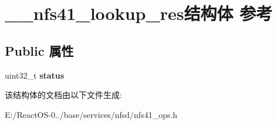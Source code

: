 \hypertarget{struct____nfs41__lookup__res}{}\section{\+\_\+\+\_\+nfs41\+\_\+lookup\+\_\+res结构体 参考}
\label{struct____nfs41__lookup__res}
\subsection*{Public 属性}
\begin{DoxyCompactItemize}
\item 
\mbox{\label{struct____nfs41__lookup__res_ab39e238056ab8b247434d118f7d626a4}} 
uint32\+\_\+t {\bfseries status}
\end{DoxyCompactItemize}


该结构体的文档由以下文件生成\+:\begin{DoxyCompactItemize}
\item 
E\+:/\+React\+O\+S-\/0../base/services/nfsd/nfs41\+\_\+ops.\+h\end{DoxyCompactItemize}
